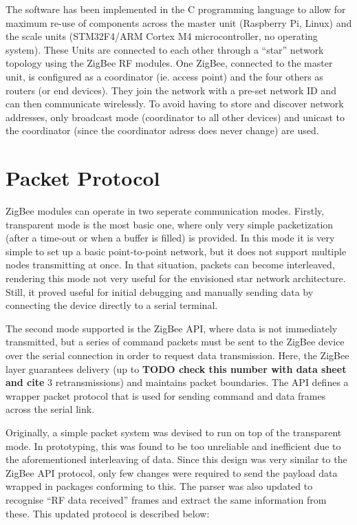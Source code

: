The software has been implemented in the C programming language to allow for maximum re-use of components across the master unit (Raspberry Pi, Linux) and the scale units (STM32F4/ARM Cortex M4 microcontroller, no operating system). These Units are connected to each other through a ``star'' network topology using the ZigBee RF modules. One ZigBee, connected to the master unit, is configured as a coordinator (ie. access point) and the four others as routers (or end devices). They join the network with a pre-set network ID and can then communicate wirelessly. To avoid having to store and discover network addresses, only broadcast mode (coordinator to all other devices) and unicast to the coordinator (since the coordinator adress does never change) are used.

\section{Packet Protocol}
\label{section:software-impl-packets}
ZigBee modules can operate in two seperate communication modes. Firstly, transparent mode is the most basic one, where only very simple packetization (after a time-out or when a buffer is filled) is provided. In this mode it is very simple to set up a basic point-to-point network, but it does not support multiple nodes transmitting at once. In that situation, packets can become interleaved, rendering this mode not very useful for the envisioned star network architecture. Still, it proved useful for initial debugging and manually sending data by connecting the device directly to a serial terminal.

The second mode supported is the ZigBee API, where data is not immediately transmitted, but a series of command packets must be sent to the ZigBee device over the serial connection in order to request data transmission. Here, the ZigBee layer guarantees delivery (up to \textbf{TODO check this number with data sheet and cite} 3 retransmissions) and maintains packet boundaries. The API defines a wrapper packet protocol that is used for sending command and data frames across the serial link\cite[page 35]{xbee-datasheet}.

Originally, a simple packet system was devised to run on top of the transparent mode. In prototyping, this was found to be too unreliable and inefficient due to the aforementioned interleaving of data. Since this design was very similar to the ZigBee API protocol, only few changes were required to send the payload data wrapped in packages conforming to this. The parser was also updated to recognise ``RF data received'' frames and extract the same information from these. This updated protocol is described below:

